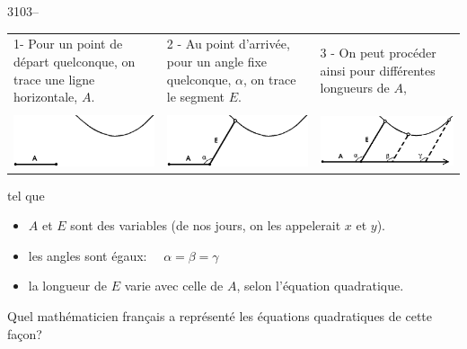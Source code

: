 \documentclass[letterpaper, 12pt]{article}
\begin{document}
3103--\\

\begin{tabular}{p{6cm} p{6cm} p{6cm}}
1- Pour un point de d\'epart quelconque, on trace une ligne horizontale, $A$. & 2 - Au point d'arriv\'ee, pour un angle fixe quelconque, $\alpha$, on trace le segment $E$. & 3 - On peut proc\'eder ainsi pour diff\'erentes longueurs de $A$,\\
 & & \\
\includegraphics[scale=0.3]{etape1.eps} & \includegraphics[scale=0.3]{etape2.eps} & \includegraphics[scale=0.3]{etape3.eps}\\
\end{tabular}
tel que
\begin{itemize}
\item $A$ et $E$ sont des variables (de nos jours, on les appelerait $x$ et $y$).
\item les angles sont \'egaux: \ \ $\alpha = \beta = \gamma$
\item la longueur de $E$ varie avec celle de $A$, selon l'\'equation quadratique.\\
\end{itemize}
Quel math\'ematicien fran\c cais a repr\'esent\'e les \'equations quadratiques de cette fa\c con?\\
\end{document}
